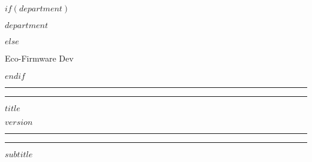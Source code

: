 \documentclass[
$if(fontsize)$
  $fontsize$,
$endif$
  a4paper
]{scrartcl}
\begin{document}
\begin{titlepage}

	\centering %
        \vspace{1.5\baselineskip} %

	$if(department)$
        \begin{flushleft}
		\textsf{$department$}
	\end{flushleft}
        $else$
        \begin{flushleft}
		\textsf{Eco-Firmware Dev}
	\end{flushleft}
        $endif$


        \rule{\textwidth}{1.6pt}\vspace*{-\baselineskip}\vspace*{1.5pt} %

        \rule{\textwidth}{0.4pt}           %

        \vspace{1.5\baselineskip}          %

	{\LARGE \textbf{$title$}}          %

	\vspace{0.5\baselineskip}

	{\Large \textbf{$version$}}        %

        \vspace{0.75\baselineskip}         %

        \rule{\textwidth}{0.4pt}\vspace*{-\baselineskip}\vspace{3pt} %

        \rule{\textwidth}{1.6pt}           %

        \vspace{2\baselineskip}            %


	{\large \textbf{$subtitle$}}


        \vspace*{4\baselineskip} %


\end{titlepage}
\end{document}
